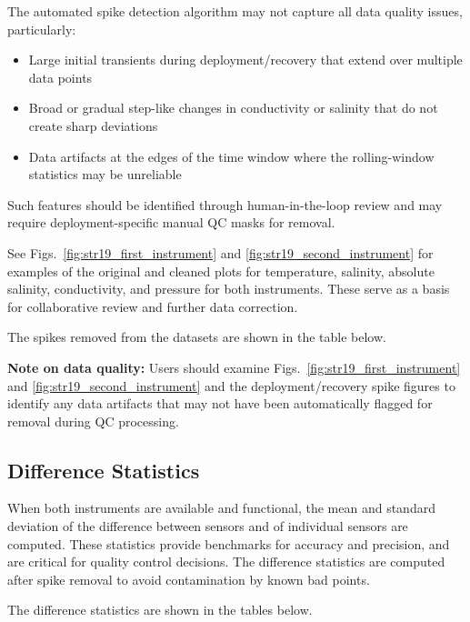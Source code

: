 The automated spike detection algorithm may not capture all data quality issues, particularly:
\begin{itemize}
    \item Large initial transients during deployment/recovery that extend over multiple data points
    \item Broad or gradual step-like changes in conductivity or salinity that do not create sharp deviations
    \item Data artifacts at the edges of the time window where the rolling-window statistics may be unreliable
\end{itemize}
Such features should be identified through human-in-the-loop review and may require deployment-specific manual QC masks for removal.

See Figs.~\ref{fig:str19_first_instrument} and \ref{fig:str19_second_instrument} for examples of the original and cleaned plots for temperature, salinity, absolute salinity, conductivity, and pressure for both instruments.
These serve as a basis for collaborative review and further data correction.

The spikes removed from the datasets are shown in the table below.



\textbf{Note on data quality:} Users should examine Figs.~\ref{fig:str19_first_instrument} and \ref{fig:str19_second_instrument} and the deployment/recovery spike figures to identify any data artifacts that may not have been automatically flagged for removal during QC processing.

\subsection{Difference Statistics}
When both instruments are available and functional, 
the mean and standard deviation of the difference between sensors and of individual sensors are computed. 
These statistics provide benchmarks for accuracy and precision, and are critical for quality control decisions.
The difference statistics are computed after spike removal to avoid contamination by known bad points.

The difference statistics are shown in the tables below.

